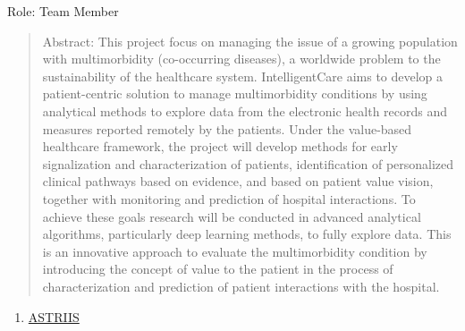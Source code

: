 \documentclass[
]{article}
\begin{document}
Role: Team Member

\begin{quote}
Abstract: This project focus on managing the issue of a growing
population with multimorbidity (co-occurring diseases), a worldwide
problem to the sustainability of the healthcare system. IntelligentCare
aims to develop a patient-centric solution to manage multimorbidity
conditions by using analytical methods to explore data from the
electronic health records and measures reported remotely by the
patients. Under the value-based healthcare framework, the project will
develop methods for early signalization and characterization of
patients, identification of personalized clinical pathways based on
evidence, and based on patient value vision, together with monitoring
and prediction of hospital interactions. To achieve these goals research
will be conducted in advanced analytical algorithms, particularly deep
learning methods, to fully explore data. This is an innovative approach
to evaluate the multimorbidity condition by introducing the concept of
value to the patient in the process of characterization and prediction
of patient interactions with the hospital.
\end{quote}

\begin{enumerate}
\def\labelenumi{\arabic{enumi}.}
\setcounter{enumi}{3}
\item
  \ul{ASTRIIS}
\end{enumerate}
\end{document}
